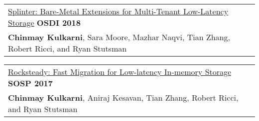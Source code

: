 \documentclass[margin,line]{res}
\begin{document}
\begin{resume}
 \vspace{-2.5pt}
 \begin{tabular}{@{}p{5.5in}p{4in}}
 \href{http://utah.systems/projects/kulkarni\_splinter}{Splinter:
 Bare-Metal Extensions for Multi-Tenant Low-Latency Storage} \hfill
 {\small\bf OSDI 2018}\\
 {\small{\bf Chinmay Kulkarni}, Sara Moore, Mazhar Naqvi, Tian Zhang, Robert
 Ricci, and Ryan Stutsman}\\
 \end{tabular}

 \vspace{-2.5pt}
 \begin{tabular}{@{}p{5.5in}p{4in}}
 \href{http://utah.systems/projects/kulkarni\_rocksteady}{Rocksteady: Fast
 Migration for Low-latency In-memory Storage} \hfill
 {\small\bf SOSP 2017}\\
 {\small{\bf Chinmay Kulkarni}, Aniraj Kesavan, Tian Zhang, Robert
 Ricci, and Ryan Stutsman}\\
 \end{tabular}






\end{resume}
\end{document}
